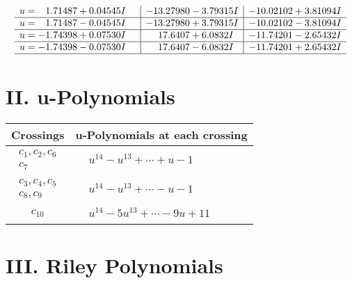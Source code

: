 \documentclass[1p]{elsarticle_modified}
\theoremstyle{definition}
\begin{document}
$$\begin{array}{c|c|c}
\begin{aligned}
u &= \phantom{-}1.71487 + 0.04545 I\end{aligned}
 & -13.27980 - 3.79315 I & -10.02102 + 3.81094 I \\ \hline\begin{aligned}
u &= \phantom{-}1.71487 - 0.04545 I\end{aligned}
 & -13.27980 + 3.79315 I & -10.02102 - 3.81094 I \\ \hline\begin{aligned}
u &= -1.74398 + 0.07530 I\end{aligned}
 & \phantom{-}17.6407 + 6.0832 I & -11.74201 - 2.65432 I \\ \hline\begin{aligned}
u &= -1.74398 - 0.07530 I\end{aligned}
 & \phantom{-}17.6407 - 6.0832 I & -11.74201 + 2.65432 I\\
 \hline 
 \end{array}$$\newpage
\newpage\renewcommand{\arraystretch}{1}
\centering \section*{ II. u-Polynomials}
\begin{tabular}{m{50pt}|m{274pt}}
Crossings & \hspace{64pt}u-Polynomials at each crossing \\
\hline $$\begin{aligned}c_{1},c_{2},c_{6}\\c_{7}\end{aligned}$$&$\begin{aligned}
&u^{14}- u^{13}+\cdots+u-1
\end{aligned}$\\
\hline $$\begin{aligned}c_{3},c_{4},c_{5}\\c_{8},c_{9}\end{aligned}$$&$\begin{aligned}
&u^{14}- u^{13}+\cdots- u-1
\end{aligned}$\\
\hline $$\begin{aligned}c_{10}\end{aligned}$$&$\begin{aligned}
&u^{14}-5 u^{13}+\cdots-9 u+11
\end{aligned}$\\
\hline
\end{tabular}\newpage\renewcommand{\arraystretch}{1}
\centering \section*{ III. Riley Polynomials}
\end{document}
